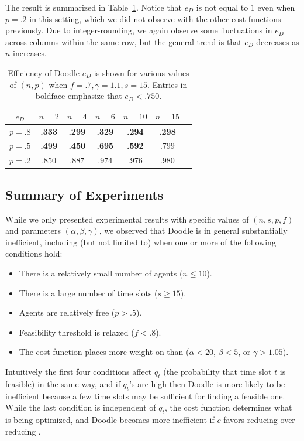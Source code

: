 The result is summarized in Table~\ref{bdoodle:table:DoodleEfficiency-lower-attendance_inconvenience_averse}. Notice that $e_{D}$ is not equal to $1$ even when $p = .2$ in this setting, which we did not observe with the other cost functions previously. Due to integer-rounding, we again observe some fluctuations in $e_{D}$ across columns within the same row, but the general trend is that $e_{D}$ decreases as $n$ increases.
\begin{table}[h]  %
\centering
\begin{tabular}{|c|c|c|c|c|c|c|}
	\hline
	$e_{D}$ & $n = 2$ & $n = 4$ & $n = 6$ & $ n = 10 $ & $n = 15$ \\ \hline
	$p = .8$ & \textbf{.333} & \textbf{.299} & \textbf{.329} & \textbf{.294} & \textbf{.298} \\ \hline
	$p = .5$ & \textbf{.499} & \textbf{.450} & \textbf{.695} & \textbf{.592} & .799  \\ \hline
	$p = .2$ & .850 & .887 & .974 & .976 & .980 \\ \hline	
\end{tabular}
\caption{Efficiency of Doodle $e_{D}$ is shown for various values of $(n, p)$ when $f = .7, \gamma=1.1, s = 15$.
Entries in boldface emphasize that $e_{D} < .750$.
} \label{bdoodle:table:DoodleEfficiency-lower-attendance_inconvenience_averse}
\end{table}


\subsection{Summary of Experiments}
While we only presented experimental results with specific values of $(n, s, p, f)$ and parameters $(\alpha, \beta, \gamma)$, we observed that Doodle is in general substantially inefficient, including (but not limited to) when one or more of the following conditions hold:
\begin{itemize} 
	\item There is a relatively small number of agents ($n \leq 10$).
	\item There is a large number of time slots ($s \geq 15$).
	\item Agents are relatively free ($p > .5$).
	\item Feasibility threshold is relaxed ($f < .8$).
	\item The cost function places more weight on \Inconveniences than \Times ($\alpha < 20$, $\beta < 5$, or $\gamma > 1.05$).
\end{itemize}
Intuitively the first four conditions affect $q_t$ (the probability that time slot $t$ is feasible) in the same way, and if $q_t$'s are high then Doodle is more likely to be inefficient because a few time slots may be sufficient for finding a feasible one. While the last condition is independent of $q_t$, the cost function determines what is being optimized, and Doodle becomes more inefficient if $c$ favors reducing \Inconveniences over reducing \Time.




